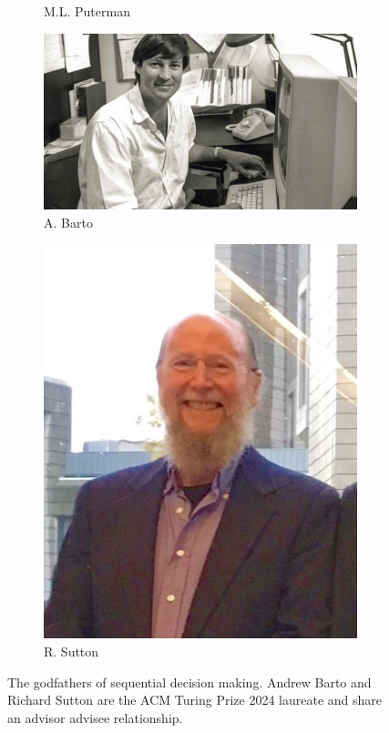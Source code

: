 \begin{figure}
\begin{subfigure}[b]{0.22\textwidth}
        \caption{M.L. Puterman}
    \end{subfigure}
    \hfill
    \begin{subfigure}[b]{0.22\textwidth}
        \centering
        \includegraphics[width=\textwidth]{images/images_intro/Barto_1982_umass_amherst.jpg}
        \caption{A. Barto}
    \end{subfigure}
    \hfill
    \begin{subfigure}[b]{0.22\textwidth}
        \centering
        \includegraphics[width=\textwidth]{images/images_intro/sutton.jpg}
        \caption{R. Sutton}
    \end{subfigure}
       \caption{The godfathers of sequential decision making. Andrew Barto and Richard Sutton are the ACM Turing Prize 2024 laureate and share an advisor advisee relationship.}
       \label{fig:three graphs}
\end{figure}
